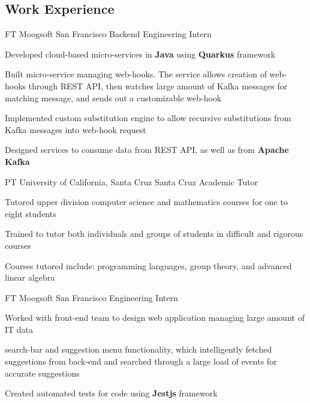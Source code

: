 \documentclass[10pt]{article}
\begin{document}
\begin{paracol}{2} %


\section{Work Experience}


{FT}
{Moogsoft}
{San Francisco}
{Backend Engineering Intern}
{}
{
\item Developed cloud-based micro-services in \textbf{Java} using \textbf{Quarkus} framework
\item Built micro-service managing web-hooks. The service allows creation of web-hooks through REST API, then watches large amount of Kafka messages for matching message, and sends out a customizable web-hook
\item Implemented custom substitution engine to allow recursive substitutions from Kafka messages into web-hook request
\item Designed services to consume data from REST API, as well as from \textbf{Apache Kafka}
}

{PT}
{University of California, Santa Cruz}
{Santa Cruz}
{Academic Tutor}
{}
{
\item Tutored upper division computer science and mathematics courses for one to eight students
\item Trained to tutor both individuals and groups of students in difficult and rigorous courses
\item Courses tutored include: programming languages, group theory, and advanced linear algebra
}

{FT}
{Moogsoft}
{San Francisco}
{Engineering Intern}
{}
{
\item Worked with front-end team to design web application managing large amount of IT data
\item search-bar and suggestion menu functionality, which intelligently fetched suggestions from back-end and searched through a large load of events for accurate suggestions
\item Created automated tests for code using \textbf{Jestjs} framework
}


\end{paracol}
\end{document}
